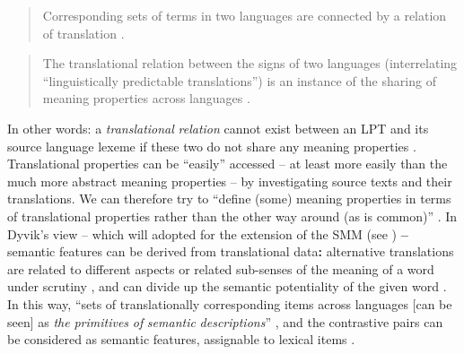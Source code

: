 \begin{quote}
Corresponding sets of terms in two languages are connected by a relation of translation \citep[29]{langemets_translations_2005}.
\end{quote}

\begin{quote}
The translational relation between the signs of two languages (interrelating ``linguistically predictable translations'') is an instance of the sharing of meaning properties across languages \citep[217]{hasselgard_complexity_1999}.
\end{quote}

In other words: a \textit{translational} \textit{relation} cannot exist between an LPT and its source language lexeme if these two do not share any meaning properties \citep[218]{hasselgard_complexity_1999}. Translational properties can be ``easily'' accessed – at least more easily than the much more abstract meaning properties – by investigating source texts and their translations. We can therefore  try to “define (some) meaning properties in terms of translational properties rather than the other way around (as is common)” \citep[218]{hasselgard_complexity_1999}. In Dyvik’s view – which will adopted for the extension of the SMM (see ) \textbf{–} semantic features can be derived from translational data\textbf{:} alternative translations are related to different aspects or related sub-senses of the meaning of a word under scrutiny \citep[31]{langemets_translations_2005}, and can divide up the semantic potentiality of the given word \citep[31]{langemets_translations_2005}. In this way, “sets of translationally corresponding items across languages [can be seen] as \textit{the} \textit{primitives} \textit{of} \textit{semantic} \textit{descriptions}” \citep[31]{langemets_translations_2005}, and the contrastive pairs can be considered as semantic features, assignable to lexical items \citep[31]{langemets_translations_2005}.

